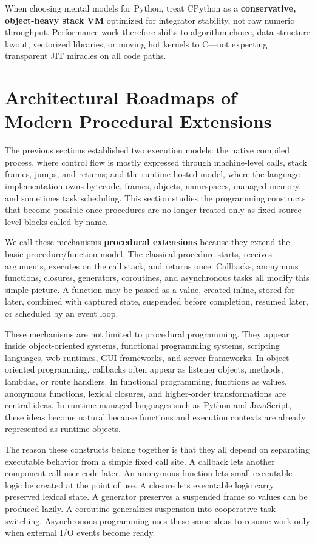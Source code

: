 \documentclass[a4paper,twoside]{report}
\begin{document}
When choosing mental models for Python, treat CPython as a \textbf{conservative, object-heavy stack VM} optimized for integrator stability, not raw numeric throughput. Performance work therefore shifts to algorithm choice, data structure layout, vectorized libraries, or moving hot kernels to C---not expecting transparent JIT miracles on all code paths.


\section{Architectural Roadmaps of Modern Procedural Extensions}


The previous sections established two execution models: the native compiled process, where control flow is mostly expressed through machine-level calls, stack frames, jumps, and returns; and the runtime-hosted model, where the language implementation owns bytecode, frames, objects, namespaces, managed memory, and sometimes task scheduling. This section studies the programming constructs that become possible once procedures are no longer treated only as fixed source-level blocks called by name.

We call these mechanisms \textbf{procedural extensions} because they extend the basic procedure/function model. The classical procedure starts, receives arguments, executes on the call stack, and returns once. Callbacks, anonymous functions, closures, generators, coroutines, and asynchronous tasks all modify this simple picture. A function may be passed as a value, created inline, stored for later, combined with captured state, suspended before completion, resumed later, or scheduled by an event loop.

These mechanisms are not limited to procedural programming. They appear inside object-oriented systems, functional programming systems, scripting languages, web runtimes, GUI frameworks, and server frameworks. In object-oriented programming, callbacks often appear as listener objects, methods, lambdas, or route handlers. In functional programming, functions as values, anonymous functions, lexical closures, and higher-order transformations are central ideas. In runtime-managed languages such as Python and JavaScript, these ideas become natural because functions and execution contexts are already represented as runtime objects.

The reason these constructs belong together is that they all depend on separating executable behavior from a simple fixed call site. A callback lets another component call user code later. An anonymous function lets small executable logic be created at the point of use. A closure lets executable logic carry preserved lexical state. A generator preserves a suspended frame so values can be produced lazily. A coroutine generalizes suspension into cooperative task switching. Asynchronous programming uses these same ideas to resume work only when external I/O events become ready.
\end{document}
